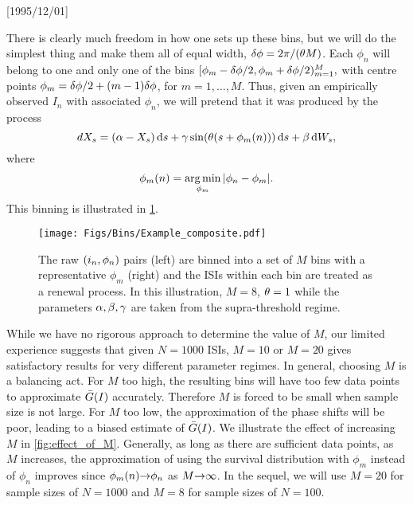 \NeedsTeXFormat{LaTeX2e}[1995/12/01] \documentclass[10pt]{bmc_article}
\newenvironment{bmcformat}{\begin{raggedright}\baselineskip20pt\sloppy\setboolean{publ}{false}}{\end{raggedright}\baselineskip20pt\sloppy}
\begin{document}
\begin{bmcformat}
There is clearly much freedom in how one sets up these bins, but we will do the
simplest thing and make them all of equal width, ${ \delta \phi } = 2 \pi / {({\theta} M)}$.
Each $\phi_n$ will belong to one and only one of the bins $ [\phi_m - { \delta \phi }/2,
\phi_m + { \delta \phi }/2)_{m=1}^M, $ with centre points $ \phi_m = { \delta \phi } / 2 + (m-1)
{ \delta \phi }$, for $m = 1,\ldots, M$. Thus, given an empirically observed $I_n$ with
associated $\phi_n$, we will pretend that it was produced by the process $$ dX_s
= ({\alpha} - X_s) \, \mathrm{d} s  + {\gamma } \sin({\theta} (s+\phi_m(n) ))
\, \mathrm{d} s
+ {\beta} \, \mathrm{d} W_s, $$ where $$ \phi_m(n)  = \argmin_{\phi_m} {| \phi_n - \phi_m|}.
$$ This binning is illustrated in \cref{fig:binning_visualized}.
\begin{figure}[ht]
\begin{center}
\texttt{[image: Figs/Bins/Example\_composite.pdf]}
  \end{center}
\caption{ The raw $({ i_n}, \phi_n)$ pairs (left) are binned into a set of $M$ bins
with a representative $\phi_m$ (right) and the ISIs within each bin are treated
as a renewal process. In this illustration, $M=8$, ${\theta} =
1$ while the parameters ${{\alpha},{\beta},{\gamma } }$ are taken from the
supra-threshold regime. }
\label{fig:binning_visualized} 
\end{figure}

While we have no rigorous approach to determine the value of $M$, our limited
experience suggests that given $N=1000$ ISIs, $M=10$ or $M=20$ gives satisfactory
results for very different parameter regimes. In general, choosing $M$ is a
balancing act. For $M$ too high, the resulting bins will have too few data
points to approximate ${ \bar{G} }(I)$ accurately. Therefore $M$ is forced to be small
when sample size is not large. For $M$ too low, the approximation of the phase
shifts will be poor, leading to a biased estimate of ${ \bar{G} }(I)$. We illustrate the
effect of increasing $M$ in \cref{fig:effect_of_M}. Generally, as long as there
are sufficient data points, as $M$ increases, the approximation of using the
survival distribution with $\phi_m$ instead of $\phi_n$ improves since
$\phi_m(n) {\rightarrow} \phi_n$ as $M {\rightarrow} \infty$. In the sequel, we will use $M=20$ for
sample sizes of $N=1000$ and $M=8$ for sample sizes of $N=100$.


\end{bmcformat}
\end{document}
